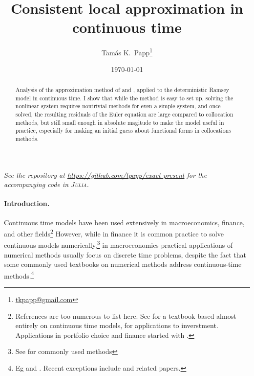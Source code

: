 \documentclass[a4paper,11pt]{article}
\begin{document}
\title{Consistent local approximation in continuous time}
\author{Tam\'as K.~Papp\thanks{\url{tkpapp@gmail.com}}}
\date{\today}
\maketitle

\begin{abstract}
  Analysis of the approximation method of \textcite{den2015exact} and \textcite{levintal2016taylor}, applied to the deterministic Ramsey model in continuous time. I show that while the method is easy to set up, solving the nonlinear system requires nontrivial methods for even a simple system, and once solved, the resulting residuals of the Euler equation are large compared to collocation methods, but still small enough in absolute magitude to make the model useful in practice, especially for making an initial guess about functional forms in collocations methods. 
\end{abstract}

\begin{center}
  \textsl{See the repository at \url{https://github.com/tpapp/exact-present} 
    for the accompanying code in \textsc{Julia}\nocite{bezanson17:_julia}.}
\end{center}

\paragraph{Introduction.}

Continuous time models have been used extensively in macroeconomics, finance, and other fields\footnote{References are too numerous to list here. See \textcite{acemoglu2008introduction} for a textbook based almost entirely on continuous time models, \textcite{dixit1996investment} for applications to inverstment. Applications in portfolio choice and finance started with \textcite{merton1971optimum}.} However, while in finance it is common practice to solve continuous models numerically,\footnote{See \textcite{hull2009options} for commonly used methods} in macroeconomics practical applications of numerical methods usually focus on discrete time problems, despite the fact that some commonly used textbooks on numerical methods address continuous-time methods.\footnote{Eg \textcite{judd98:_numer_method_in_econom} and \textcite{miranda02:_applied_comput_econom_and_finan}. Recent exceptions include \textcite{kaplan2016monetary} and related papers.}
\end{document}

